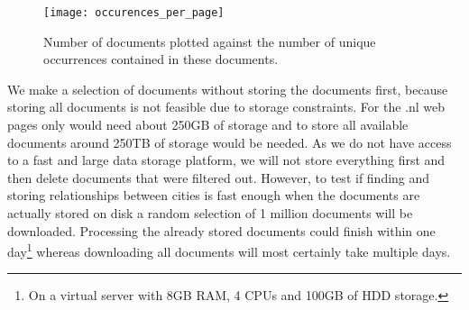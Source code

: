 \begin{figure}
    \centering
    \texttt{[image: occurences\_per\_page]}
    \caption{Number of documents plotted against the number of unique occurrences contained in these documents.}
    \label{fig:occ_per_page}
\end{figure}

We make a selection of documents without storing the documents first, because storing all documents is not feasible due to storage constraints. For the .nl web pages only would need about 250GB of storage and to store all available documents around 250TB of storage would be needed. As we do not have access to a fast and large data storage platform, we will not store everything first and then delete documents that were filtered out. However, to test if finding and storing relationships between cities is fast enough when the documents are actually stored on disk a random selection of 1 million documents will be downloaded. Processing the already stored documents could finish within one day\footnote{On a virtual server with 8GB RAM, 4 CPUs and 100GB of HDD storage.} whereas downloading all documents will most certainly take multiple days.




